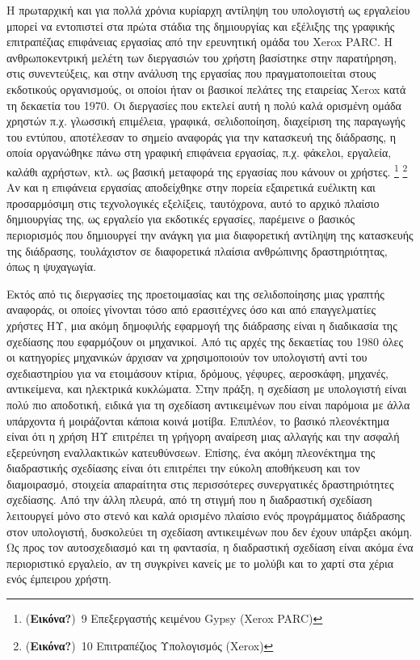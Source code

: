 \documentclass[
]{article}
\begin{document}
Η πρωταρχική και για πολλά χρόνια κυρίαρχη αντίληψη του υπολογιστή ως
εργαλείου μπορεί να εντοπιστεί στα πρώτα στάδια της δημιουργίας και
εξέλιξης της γραφικής επιτραπέζιας επιφάνειας εργασίας από την
ερευνητική ομάδα του Xerox PARC. Η ανθρωποκεντρική μελέτη των διεργασιών
του χρήστη βασίστηκε στην παρατήρηση, στις συνεντεύξεις, και στην
ανάλυση της εργασίας που πραγματοποιείται στους εκδοτικούς οργανισμούς,
οι οποίοι ήταν οι βασικοί πελάτες της εταιρείας Xerox κατά τη δεκαετία
του 1970. Οι διεργασίες που εκτελεί αυτή η πολύ καλά ορισμένη ομάδα
χρηστών π.χ. γλωσσική επιμέλεια, γραφικά, σελιδοποίηση, διαχείριση της
παραγωγής του εντύπου, αποτέλεσαν το σημείο αναφοράς για την κατασκευή
της διάδρασης, η οποία οργανώθηκε πάνω στη γραφική επιφάνεια εργασίας,
π.χ. φάκελοι, εργαλεία, καλάθι αχρήστων, κτλ. ως βασική μεταφορά της
εργασίας που κάνουν οι χρήστες. \footnote{(\textbf{Εικόνα?})~9
  Επεξεργαστής κειμένου Gypsy (Xerox PARC)} \footnote{(\textbf{Εικόνα?})~10
  Επιτραπέζιος Υπολογισμός (Xerox)} Αν και η επιφάνεια εργασίας
αποδείχθηκε στην πορεία εξαιρετικά ευέλικτη και προσαρμόσιμη στις
τεχνολογικές εξελίξεις, ταυτόχρονα, αυτό το αρχικό πλαίσιο δημιουργίας
της, ως εργαλείο για εκδοτικές εργασίες, παρέμεινε ο βασικός περιορισμός
που δημιουργεί την ανάγκη για μια διαφορετική αντίληψη της κατασκευής
της διάδρασης, τουλάχιστον σε διαφορετικά πλαίσια ανθρώπινης
δραστηριότητας, όπως η ψυχαγωγία.

Εκτός από τις διεργασίες της προετοιμασίας και της σελιδοποίησης μιας
γραπτής αναφοράς, οι οποίες γίνονται τόσο από ερασιτέχνες όσο και από
επαγγελματίες χρήστες ΗΥ, μια ακόμη δημοφιλής εφαρμογή της διάδρασης
είναι η διαδικασία της σχεδίασης που εφαρμόζουν οι μηχανικοί. Από τις
αρχές της δεκαετίας του 1980 όλες οι κατηγορίες μηχανικών άρχισαν να
χρησιμοποιούν τον υπολογιστή αντί του σχεδιαστηρίου για να ετοιμάσουν
κτίρια, δρόμους, γέφυρες, αεροσκάφη, μηχανές, αντικείμενα, και ηλεκτρικά
κυκλώματα. Στην πράξη, η σχεδίαση με υπολογιστή είναι πολύ πιο
αποδοτική, ειδικά για τη σχεδίαση αντικειμένων που είναι παρόμοια με
άλλα υπάρχοντα ή μοιράζονται κάποια κοινά μοτίβα. Επιπλέον, το βασικό
πλεονέκτημα είναι ότι η χρήση ΗΥ επιτρέπει τη γρήγορη αναίρεση μιας
αλλαγής και την ασφαλή εξερεύνηση εναλλακτικών κατευθύνσεων. Επίσης, ένα
ακόμη πλεονέκτημα της διαδραστικής σχεδίασης είναι ότι επιτρέπει την
εύκολη αποθήκευση και τον διαμοιρασμό, στοιχεία απαραίτητα στις
περισσότερες συνεργατικές δραστηριότητες σχεδίασης. Από την άλλη πλευρά,
από τη στιγμή που η διαδραστική σχεδίαση λειτουργεί μόνο στο στενό και
καλά ορισμένο πλαίσιο ενός προγράμματος διάδρασης στον υπολογιστή,
δυσκολεύει τη σχεδίαση αντικειμένων που δεν έχουν υπάρξει ακόμη.\\
Ως προς τον αυτοσχεδιασμό και τη φαντασία, η διαδραστική σχεδίαση είναι
ακόμα ένα περιοριστικό εργαλείο, αν τη συγκρίνει κανείς με το μολύβι και
το χαρτί στα χέρια ενός έμπειρου χρήστη.
\end{document}
